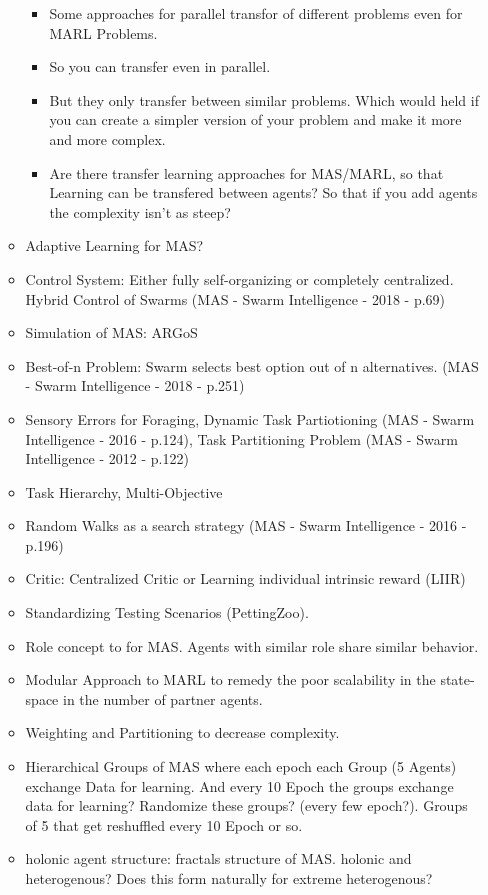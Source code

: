 \begin{itemize}
\begin{itemize}[noitemsep,nolistsep]
\begin{itemize}[noitemsep,nolistsep]
			\item Some approaches for parallel transfor of different problems even for MARL Problems.
			\item So you can transfer even in parallel.
			\item But they only transfer between similar problems. Which would held if you can create a simpler version of your problem and make it more and more complex.
			\item Are there transfer learning approaches for MAS/MARL, so that Learning can be transfered between agents? So that if you add agents the complexity isn't as steep?
		\end{itemize}
		\item Adaptive Learning for MAS?
		\item Control System: Either fully self-organizing or completely centralized. Hybrid Control of Swarms (MAS - Swarm Intelligence - 2018 - p.69)
		\item Simulation of MAS: ARGoS
		\item Best-of-n Problem: Swarm selects best option out of n alternatives. (MAS - Swarm Intelligence - 2018 - p.251)
		\item Sensory Errors for Foraging, Dynamic Task Partiotioning (MAS - Swarm Intelligence - 2016 - p.124), Task Partitioning Problem (MAS - Swarm Intelligence - 2012 - p.122)
		\item Task Hierarchy, Multi-Objective
		\item Random Walks as a search strategy (MAS - Swarm Intelligence - 2016 - p.196)
		\item Critic: Centralized Critic or Learning individual intrinsic reward (LIIR)
		\item Standardizing Testing Scenarios (PettingZoo).
		\item Role concept to for MAS. Agents with similar role share similar behavior.
		\item Modular Approach to MARL to remedy the poor scalability in the state-space in the number of partner agents.
		\item Weighting and Partitioning to decrease complexity.
		\item Hierarchical Groups of MAS where each epoch each Group (5 Agents) exchange Data for learning. And every 10 Epoch the groups exchange data for learning? Randomize these groups? (every few epoch?). Groups of 5 that get reshuffled every 10 Epoch or so.
		\item holonic agent structure: fractals structure of MAS. holonic and heterogenous? Does this form naturally for extreme heterogenous?

\end{itemize}
\end{itemize}
